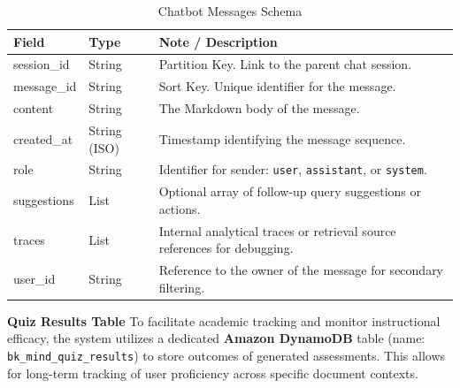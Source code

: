 \begin{table}[H]
    \centering
    \begin{tabular}{llp{8cm}}
        \toprule
        \textbf{Field} & \textbf{Type} & \textbf{Note / Description} \\
        \midrule
        session\_id & String & Partition Key. Link to the parent chat session. \\
        message\_id & String & Sort Key. Unique identifier for the message. \\
        \midrule
        content & String & The Markdown body of the message. \\
        created\_at & String (ISO) & Timestamp identifying the message sequence. \\
        role & String & Identifier for sender: \texttt{user}, \texttt{assistant}, or \texttt{system}. \\
        suggestions & List & Optional array of follow-up query suggestions or actions. \\
        traces & List & Internal analytical traces or retrieval source references for debugging. \\
        user\_id & String & Reference to the owner of the message for secondary filtering. \\
        \bottomrule
    \end{tabular}
    \caption{Chatbot Messages Schema}
    \label{tab:chat_messages}
\end{table}

\newpage

\textbf{Quiz Results Table}
To facilitate academic tracking and monitor instructional efficacy, the system utilizes a dedicated \textbf{Amazon DynamoDB} table (name: \texttt{bk\_mind\_quiz\_results}) to store outcomes of generated assessments. This allows for long-term tracking of user proficiency across specific document contexts.

